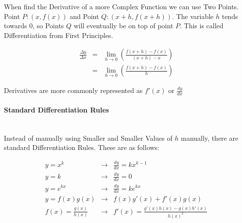 \begin{flushleft}
                    When find the Derivative of a more Complex Function we can use Two Points. Point $P : (x, f(x))$ and Point $Q : (x + h, f(x + h))$.
                    The variable $h$ tends towards 0, so Points $Q$ will eventually be on top of point $P$. This is called Differentiation from First
                    Principles.
                    \vspace{0.4cm}

                    \begin{eqnarray*}
                        \frac{\Delta y}{\Delta x} &=& \lim_{h\to0} \left(\frac{f(x + h) - f(x)}{(x + h) - x}\right) \\
                        &=& \lim_{h\to0} \left(\frac{f(x + h) - f(x)}{h}\right)
                    \end{eqnarray*}
                    \vspace{0.6cm}

                    Derivatives are more commonly represented as $f'(x)$ or $\frac{dy}{dx}$

                    \vspace{0.4cm}
                \paragraph{Standard Differentiation Rules}  \mbox{} \\
                    \vspace{0.2cm}
                    Instead of manually using Smaller and Smaller Values of $h$ manually, there are standard Differentiation Rules. These are as follows: \\
                    \vspace{0.4cm}

                    \begin{eqnarray*}
                        y = x^{k} &\rightarrow& \frac{dy}{dx} = kx^{k-1} \\
                        y = k &\rightarrow& \frac{dy}{dx} = 0 \\
                        y = e^{kx} &\rightarrow& \frac{dy}{dx} = ke^{kx} \\
                        y = f(x)g(x) &\rightarrow& f(x)g'(x) + f'(x)g(x) \\
                        f(x) = \frac{g(x)}{h(x)} &\rightarrow& f'(x) = \frac{g'(x)h(x) - g(x)h'(x)}{h(x)^{2}} \\
                    \end{eqnarray*}
                    \vspace{0.4cm}


\end{flushleft}
